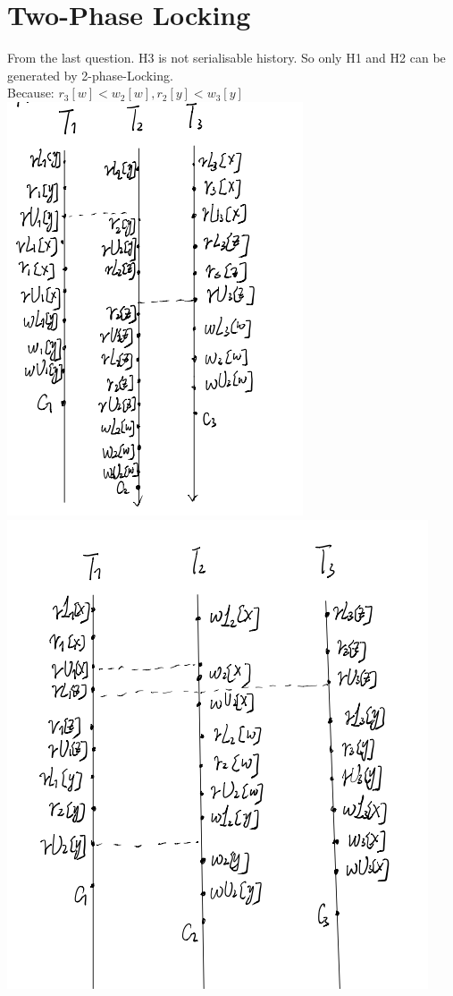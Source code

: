 \documentclass{article}
\begin{document}
\section{Two-Phase Locking}
From the last question. H3 is not serialisable history. So only H1 and H2 can be generated by 2-phase-Locking.
\\Because:
$r_3[w]<w_2[w],r_2[y]<w_3[y]$
\\
\includegraphics{3H1.png}
\includegraphics{3h2.png}
\end{document}

